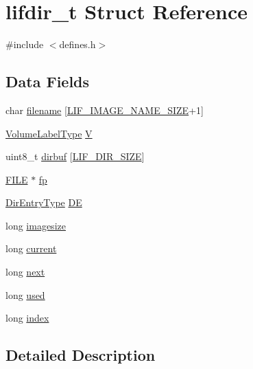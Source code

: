\hypertarget{structlifdir__t}{}\section{lifdir\+\_\+t Struct Reference}
\label{structlifdir__t}


{\ttfamily \#include $<$defines.\+h$>$}

\subsection*{Data Fields}
\begin{DoxyCompactItemize}
\item 
char \hyperlink{structlifdir__t_a21bfa7a6d54009982cc63962951ba615}{filename} \mbox{[}\hyperlink{defines_8h_a8cfa79b094fc3a5db37b26761a639e6d}{L\+I\+F\+\_\+\+I\+M\+A\+G\+E\+\_\+\+N\+A\+M\+E\+\_\+\+S\+I\+ZE}+1\mbox{]}
\item 
\hyperlink{structVolumeLabelType}{Volume\+Label\+Type} \hyperlink{structlifdir__t_a5a888dc3f1844ff0c8203d5bb0aa48b4}{V}
\item 
uint8\+\_\+t \hyperlink{structlifdir__t_a993ecf6e2652f0e12d56f96a34b806e1}{dirbuf} \mbox{[}\hyperlink{defines_8h_a99ad70dd3200a3ee46388bc2c36fe720}{L\+I\+F\+\_\+\+D\+I\+R\+\_\+\+S\+I\+ZE}\mbox{]}
\item 
\hyperlink{posix_8h_aed4dabeb9f7c518ded42f930a04abce8}{F\+I\+LE} $\ast$ \hyperlink{structlifdir__t_ad764305f0b8c8b95ea0f0690530babcb}{fp}
\item 
\hyperlink{structDirEntryType}{Dir\+Entry\+Type} \hyperlink{structlifdir__t_ab078670aa2cc7d106864d2dd1227def6}{DE}
\item 
long \hyperlink{structlifdir__t_a2cae1515444f013eaf439333e3952b1d}{imagesize}
\item 
long \hyperlink{structlifdir__t_a662534fa317565f8f6992515e1eb39c4}{current}
\item 
long \hyperlink{structlifdir__t_a52a7520a6393d4782afb0ccd42899215}{next}
\item 
long \hyperlink{structlifdir__t_a20f303d91cccc01286974be1ee064a8f}{used}
\item 
long \hyperlink{structlifdir__t_a7b9b45ee1a56ba386158da051605a8bd}{index}
\end{DoxyCompactItemize}


\subsection{Detailed Description}


